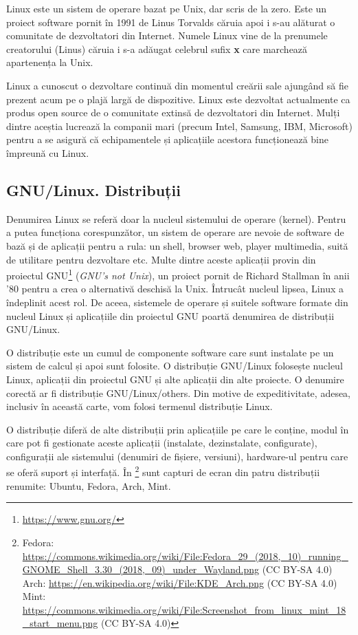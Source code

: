 Linux este un sistem de operare bazat pe Unix, dar scris de la zero. Este un proiect software pornit în 1991 de Linus Torvalds căruia apoi i s-au alăturat o comunitate de dezvoltatori din Internet. Numele Linux vine de la prenumele creatorului (Linus) căruia i s-a adăugat celebrul sufix \textbf{x} care marchează apartenența la Unix.

Linux a cunoscut o dezvoltare continuă din momentul creării sale ajungând să fie prezent acum pe o plajă largă de dispozitive. Linux este dezvoltat actualmente ca produs open source de o comunitate extinsă de dezvoltatori din Internet. Mulți dintre aceștia lucrează la companii mari (precum Intel, Samsung, IBM, Microsoft) pentru a se asigură că echipamentele și aplicațiile acestora funcționează bine împreună cu Linux.

\subsection{GNU/Linux. Distribuții}
\label{sec:intro:distros}

Denumirea Linux se referă doar la nucleul sistemului de operare (kernel). Pentru a putea funcționa corespunzător, un sistem de operare are nevoie de software de bază și de aplicații pentru a rula: un shell, browser web, player multimedia, suită de utilitare pentru dezvoltare etc. Multe dintre aceste aplicații provin din proiectul GNU\footnote{\url{https://www.gnu.org/}}  (\textit{GNU's not Unix}), un proiect pornit de Richard Stallman în anii '80 pentru a crea o alternativă deschisă la Unix. Întrucât nucleul lipsea, Linux a îndeplinit acest rol. De aceea, sistemele de operare și suitele software formate din nucleul Linux și aplicațiile din proiectul GNU poartă denumirea de distribuții GNU/Linux.

O distribuție este un cumul de componente software care sunt instalate pe un sistem de calcul și apoi sunt folosite. O distribuție GNU/Linux folosește nucleul Linux, aplicații din proiectul GNU și alte aplicații din alte proiecte. O denumire corectă ar fi distribuție GNU/Linux/others. Din motive de expeditivitate, adesea, inclusiv în această carte, vom folosi termenul distribuție Linux.

O distribuție diferă de alte distribuții prin aplicațiile pe care le conține, modul în care pot fi gestionate aceste aplicații (instalate, dezinstalate, configurate), configurații ale sistemului (denumiri de fișiere, versiuni), hardware-ul pentru care se oferă suport și interfață. În \footnote{Fedora: \url{https://commons.wikimedia.org/wiki/File:Fedora_29_(2018,_10)_running_GNOME_Shell_3.30_(2018,_09)_under_Wayland.png} (CC BY-SA 4.0)\\Arch: \url{https://en.wikipedia.org/wiki/File:KDE_Arch.png} (CC BY-SA 4.0)\\Mint: \url{https://commons.wikimedia.org/wiki/File:Screenshot_from_linux_mint_18_start_menu.png} (CC BY-SA 4.0)} sunt capturi de ecran din patru distribuții renumite: Ubuntu, Fedora, Arch, Mint.

